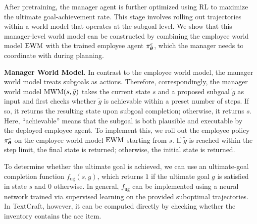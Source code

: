 

After pretraining, the manager agent is further optimized using RL to maximize the ultimate goal-achievement rate. This stage involves rolling out trajectories within a world model that operates at the subgoal level. We show that this manager-level world model can be constructed by combining the employee world model \(\text{EWM}\) with the trained employee agent \(\pi^{e}_{\boldsymbol \theta}\), which the manager needs to coordinate with during planning.

\textbf{Manager World Model.} In contrast to the employee world model, the manager world model treats subgoals as actions. Therefore, correspondingly, the manager world model $\text{MWM}(s, \tilde{g})$ takes the current state $s$ and a proposed subgoal $\tilde{g}$ as input and first checks whether $\tilde{g}$ is achievable within a preset number of steps. If so, it returns the resulting state upon subgoal completion; otherwise, it returns $s$. Here, ``achievable'' means that the subgoal is both plausible and executable by the deployed employee agent. To implement this, we roll out the employee policy \(\pi_{\boldsymbol \theta}^e\) on the employee world model \(\text{EWM}\) starting from \(s\). If \(\tilde{g}\) is reached within the step limit, the final state is returned; otherwise, the initial state is returned.

To determine whether the ultimate goal is achieved, we can use an ultimate-goal completion function $f_{\text{ug}}(s, g)$, which returns $1$ if the ultimate goal $g$ is satisfied in state $s$ and $0$ otherwise. In general, $f_{\text{ug}}$ can be implemented using a neural network trained via supervised learning on the provided suboptimal trajectories. In TextCraft, however, it can be computed directly by checking whether the inventory contains the ace item.


